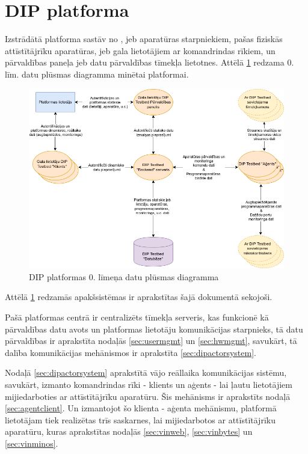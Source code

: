 \section{DIP platforma}

Izstrādātā platforma sastāv no , 
jeb aparatūras starpniekiem, pašas fiziskās attīstītājrīku aparatūras,
 jeb gala lietotājiem ar komandrindas rīkiem, un
pārvaldības paneļa jeb datu pārvaldības tīmekļa lietotnes. Attēlā
\ref{fig:dipdpd0} redzama 0. līm. datu plūsmas diagramma minētai platformai. 

\begin{figure}[H]
    \includegraphics[width=0.7\linewidth]{assets/DPD0.drawio.png}
    \centering
    \caption{DIP platformas 0. līmeņa datu plūsmas diagramma}
    \label{fig:dipdpd0}
\end{figure}

Attēlā \ref{fig:dipdpd0} redzamās apakšsistēmas ir aprakstītas šajā dokumentā
sekojoši. 

Pašā platformas centrā ir centralizēts tīmekļa serveris, kas funkcionē
kā pārvaldības datu avots un platformas lietotāju komunikācijas starpnieks, tā
datu pārvaldības ir aprakstīta nodaļās \ref{sec:usermgmt} un \ref{sec:hwmgmt},
savukārt, tā dalība komunikācijas mehānismos ir aprakstīta \ref{sec:dipactorsystem}.

Nodaļā \ref{sec:dipactorsystem} aprakstītā vājo reāllaika komunikācijas sistēmu,
savukārt, izmanto komandrindas rīki - klients un aģents - lai ļautu lietotājiem
mijiedarboties ar attīstītājrīku aparatūru. Šis mehānisms ir aprakstīts nodaļā
\ref{sec:agentclient}. Un izmantojot šo klienta - aģenta mehānismu, platformā
lietotājam tiek realizētas trīs saskarnes, lai mijiedarbotos ar attīstītājrīku
aparatūru, kuras aprakstītas nodaļās \ref{sec:vinweb}, \ref{sec:vinbytes} un
\ref{sec:vinminos}.

